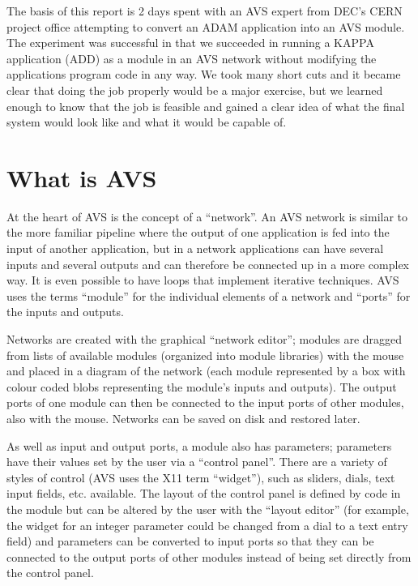 The basis of this report is 2 days spent with an AVS expert from DEC's CERN
project office attempting to convert an ADAM application into an AVS module.
The experiment was successful in that we succeeded in running a KAPPA
application (ADD) as a module in an AVS network without modifying the
applications program code in any way. We took many short cuts and it became
clear that doing the job properly would be a major exercise, but we 
learned enough to know that the job is feasible and gained a clear idea of 
what the final system would look like and what it would be capable of.  

\section{What is AVS}

At the heart of AVS is the concept of a ``network''. An AVS network is similar
to  the more familiar pipeline where the output of one application is fed into
the input of another application, but in a network applications can have
several inputs and several outputs and can therefore be connected up in a more
complex way. It is even possible to have loops that implement iterative
techniques. AVS uses the terms ``module'' for the individual elements of a
network and ``ports''  for the inputs and outputs.

Networks are created with the graphical ``network editor''; modules are dragged
from lists of available modules (organized into module libraries) with the
mouse and placed in a diagram of the network (each module represented by a box
with colour coded blobs representing the module's inputs and outputs). The
output ports of one module can then be connected to the input ports of other
modules, also with the mouse. Networks can be saved on disk and restored later.

As well as input and output ports, a module also has parameters; parameters
have their values set by the user via a ``control panel''. There are a variety
of styles of control (AVS uses the X11 term ``widget''), such as sliders,
dials, text input fields, etc. available. The layout of the control panel is
defined by code in the module but can be altered by the user with the ``layout
editor'' (for example, the widget for an integer parameter could be changed
from a dial to a text entry field) and parameters can be converted to input
ports so that they can be connected to the output ports of other modules
instead of being set directly from the control panel. 

